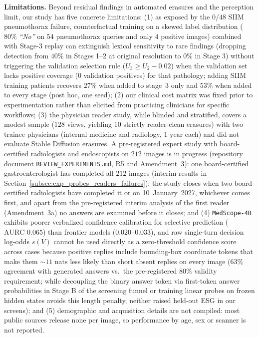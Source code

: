 \documentclass[5p,times,twocolumn,authoryear]{elsarticle}
\begin{document}
\textbf{Limitations.} Beyond residual findings in automated erasures and the perception limit, our study has five concrete limitations: (1) as exposed by the $0/48$ SIIM pneumothorax failure, counterfactual training on a skewed label distribution ($80\%$ \emph{``No''} on $54$ pneumothorax queries and only $4$ positive images) combined with Stage-3 replay can extinguish lexical sensitivity to rare findings (dropping detection from $40\%$ in Stages 1--2 at original resolution to $0\%$ in Stage 3) without triggering the validation selection rule ($U_3 \ge U_2 - 0.02$) when the validation set lacks positive coverage ($0$ validation positives) for that pathology; adding SIIM training patients recovers $27\%$ when added to stage~3 only and $53\%$ when added to every stage (post hoc, one seed); (2) our clinical cost matrix was fixed prior to experimentation rather than elicited from practicing clinicians for specific workflows; (3) the physician reader study, while blinded and stratified, covers a modest sample ($128$ views, yielding $10$ strictly reader-clean erasures) with two trainee physicians (internal medicine and radiology, $1\text{ year}$ each) and did not evaluate Stable Diffusion erasures. A pre-registered expert study with board-certified radiologists and endoscopists on $212$ images is in progress (repository document \texttt{REVIEW\_EXPERIMENTS.md}, R5 and Amendment~3): one board-certified gastroenterologist has completed all $212$ images (interim results in Section~\ref{subsec:exp_probes_readers_failures}); the study closes when two board-certified radiologists have completed it or on 10~January~2027, whichever comes first, and apart from the pre-registered interim analysis of the first reader (Amendment~3a) no answers are examined before it closes; and (4) \texttt{MedScope-4B} exhibits poorer verbalized confidence calibration for selective prediction ($\text{AURC } 0.065$) than frontier models ($0.020\text{--}0.033$), and raw single-turn decision log-odds $s(V)$ cannot be used directly as a zero-threshold confidence score across cases because positive replies include bounding-box coordinate tokens that make them $\sim 11\text{ nats}$ less likely than short absent replies on every image ($63\%$ agreement with generated answers vs.\ the pre-registered $80\%$ validity requirement; while decoupling the binary answer token via first-token answer probabilities in Stage B of the screening funnel or training linear probes on frozen hidden states avoids this length penalty, neither raised held-out ESG in our screens); and (5) demographic and acquisition details are not compiled: most public sources release none per image, so performance by age, sex or scanner is not reported.
\end{document}
